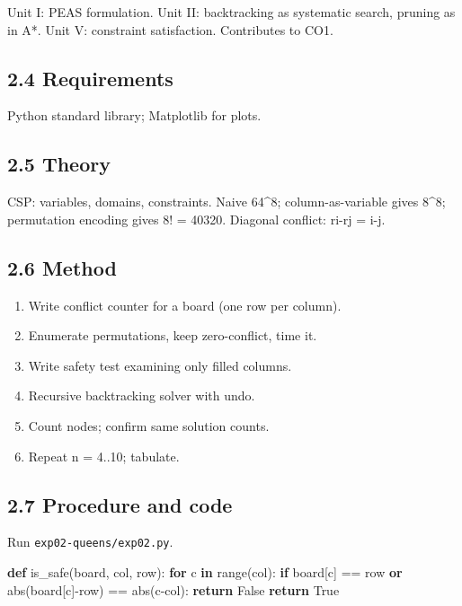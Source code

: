 \documentclass[
]{article}
\newenvironment{Shaded}{}{}
\newcommand{\BuiltInTok}[1]{\textcolor[rgb]{0.00,0.50,0.00}{#1}}
\newcommand{\ControlFlowTok}[1]{\textcolor[rgb]{0.00,0.44,0.13}{\textbf{#1}}}
\newcommand{\KeywordTok}[1]{\textcolor[rgb]{0.00,0.44,0.13}{\textbf{#1}}}
\newcommand{\NormalTok}[1]{#1}
\newcommand{\OperatorTok}[1]{\textcolor[rgb]{0.40,0.40,0.40}{#1}}
\newcommand{\VariableTok}[1]{\textcolor[rgb]{0.10,0.09,0.49}{#1}}
\providecommand{\tightlist}{%
  \setlength{\itemsep}{0pt}\setlength{\parskip}{0pt}}
\begin{document}
Unit I: PEAS formulation. Unit II: backtracking as systematic search,
pruning as in A*. Unit V: constraint satisfaction. Contributes to CO1.

\subsection{2.4 Requirements}\label{requirements-1}

Python standard library; Matplotlib for plots.

\subsection{2.5 Theory}\label{theory-1}

CSP: variables, domains, constraints. Naive 64\^{}8; column-as-variable
gives 8\^{}8; permutation encoding gives 8! = 40320. Diagonal conflict:
\textbar ri-rj\textbar{} = \textbar i-j\textbar.

\subsection{2.6 Method}\label{method-1}

\begin{enumerate}
\def\labelenumi{\arabic{enumi}.}
\tightlist
\item
  Write conflict counter for a board (one row per column).
\item
  Enumerate permutations, keep zero-conflict, time it.
\item
  Write safety test examining only filled columns.
\item
  Recursive backtracking solver with undo.
\item
  Count nodes; confirm same solution counts.
\item
  Repeat n = 4..10; tabulate.
\end{enumerate}

\subsection{2.7 Procedure and code}\label{procedure-and-code-1}

Run \texttt{exp02-queens/exp02.py}.

\begin{Shaded}
\begin{Highlighting}[]
\KeywordTok{def}\NormalTok{ is\_safe(board, col, row):}
    \ControlFlowTok{for}\NormalTok{ c }\KeywordTok{in} \BuiltInTok{range}\NormalTok{(col):}
        \ControlFlowTok{if}\NormalTok{ board[c] }\OperatorTok{==}\NormalTok{ row }\KeywordTok{or} \BuiltInTok{abs}\NormalTok{(board[c]}\OperatorTok{{-}}\NormalTok{row) }\OperatorTok{==} \BuiltInTok{abs}\NormalTok{(c}\OperatorTok{{-}}\NormalTok{col):}
            \ControlFlowTok{return} \VariableTok{False}
    \ControlFlowTok{return} \VariableTok{True}
\end{Highlighting}
\end{Shaded}
\end{document}
